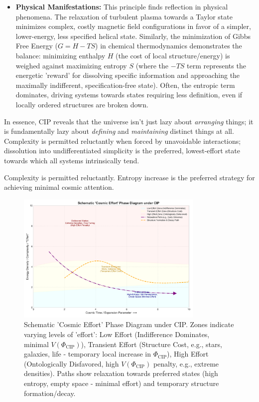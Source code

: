 \documentclass[11pt, a4paper]{article}
\newcommand{\subt}[1]{\mathrm{#1}}
\begin{document}
\begin{itemize}
    \item \textbf{Physical Manifestations:} This principle finds reflection in physical phenomena. The relaxation of turbulent plasma towards a Taylor state minimizes complex, costly magnetic field configurations in favor of a simpler, lower-energy, less specified helical state. Similarly, the minimization of Gibbs Free Energy ($G = H - TS$) in chemical thermodynamics demonstrates the balance: minimizing enthalpy $H$ (the cost of local structure/energy) is weighed against maximizing entropy $S$ (where the $-TS$ term represents the energetic 'reward' for dissolving specific information and approaching the maximally indifferent, specification-free state). Often, the entropic term dominates, driving systems towards states requiring less definition, even if locally ordered structures are broken down.
\end{itemize}

In essence, CIP reveals that the universe isn't just lazy about \textit{arranging} things; it is fundamentally lazy about \textit{defining} and \textit{maintaining} distinct things at all. Complexity is permitted reluctantly when forced by unavoidable interactions; dissolution into undifferentiated simplicity is the preferred, lowest-effort state towards which all systems intrinsically tend.

Complexity is permitted reluctantly. Entropy increase is the preferred strategy for achieving minimal cosmic attention.

\begin{figure}[htbp]
    \centering
    \includegraphics[width=0.8\textwidth]{CIP_PhaseDiagram.png}
    \caption[Schematic 'Cosmic Effort' Phase Diagram under CIP]{Schematic 'Cosmic Effort' Phase Diagram under CIP. Zones indicate varying levels of 'effort': Low Effort (Indifference Dominates, minimal $V(\Phi_{\subt{CIP}})$), Transient Effort (Structure Cost, e.g., stars, galaxies, life - temporary local increase in $\Phi_{\subt{CIP}}$), High Effort (Ontologically Disfavored, high $V(\Phi_{\subt{CIP}})$ penalty, e.g., extreme densities). Paths show relaxation towards preferred states (high entropy, empty space - minimal effort) and temporary structure formation/decay.}
    \label{fig:phase_diagram}
\end{figure}
\end{document}
